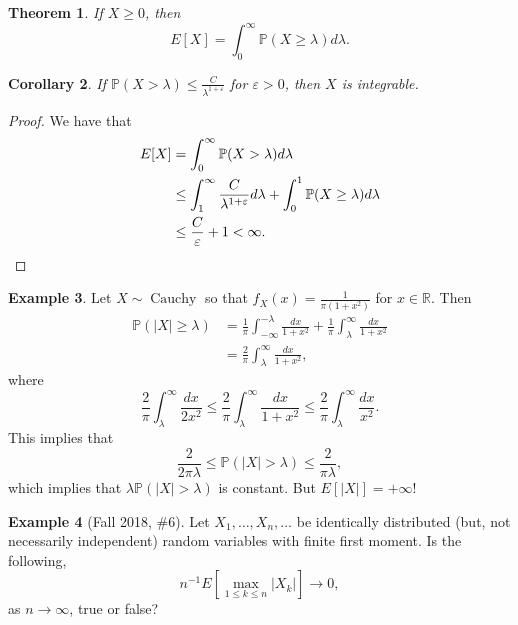 \documentclass[12pt,reqno]{article}
\theoremstyle{plain}
\newtheorem{theorem}{Theorem}[section]
\newtheorem{cor}[theorem]{Corollary}
\theoremstyle{definition}
\newtheorem{example}[theorem]{Example}
\begin{document}
\begin{theorem}
If $X \geq 0$, then 
\[
E[X] = \int_0^{\infty} \mathbb{P}(X \geq \lambda) d\lambda. 
\]
\end{theorem} 

\begin{cor} 
If $\mathbb{P}(X > \lambda) \leq \frac{C}{\lambda^{1+\varepsilon}}$ for 
$\varepsilon > 0$, then $X$ is integrable. 
\end{cor}
\begin{proof} 
We have that 
\begin{align*} 
E[X] & = \int_0^{\infty} \mathbb{P}(X > \lambda) d\lambda \\ 
     & \leq \int_1^{\infty} \frac{C}{\lambda^{1+\varepsilon}} d\lambda + 
     \int_0^1 \mathbb{P}(X \geq \lambda) d\lambda \\ 
     & \leq \frac{C}{\varepsilon} + 1 < \infty. 
     \qedhere 
\end{align*} 
\end{proof} 

\begin{example}
Let $X \sim \operatorname{Cauchy}$ so that 
$f_X(x) = \frac{1}{\pi(1+x^2)}$ for $x \in \mathbb{R}$. Then 
\begin{align*} 
\mathbb{P}(|X| \geq \lambda) & = 
     \frac{1}{\pi} \int_{-\infty}^{-\lambda} 
     \frac{dx}{1+x^2} + \frac{1}{\pi} \int_{\lambda}^{\infty} 
     \frac{dx}{1+x^2} \\ 
     & = \frac{2}{\pi} \int_{\lambda}^{\infty} \frac{dx}{1+x^2}, 
\end{align*} 
where 
\[
\frac{2}{\pi} \int_{\lambda}^{\infty} \frac{dx}{2x^2} \leq 
     \frac{2}{\pi} \int_{\lambda}^{\infty} \frac{dx}{1+x^2} \leq 
     \frac{2}{\pi} \int_{\lambda}^{\infty} \frac{dx}{x^2}. 
\]
This implies that 
\[
\frac{2}{2\pi\lambda} \leq \mathbb{P}(|X| > \lambda) \leq 
     \frac{2}{\pi\lambda}, 
\]
which implies that $\lambda \mathbb{P}(|X| > \lambda)$ is constant. 
But $E[|X|] = +\infty$! 
\end{example} 

\begin{example}[Fall 2018, \#6]
Let $X_1,\ldots,X_n,\ldots$ be identically distributed (but, not necessarily 
independent) random variables with finite first moment. Is the following, 
\[
n^{-1} E\left[\max_{1 \leq k \leq n} |X_k|\right] \longrightarrow 0, 
\]
as $n \rightarrow \infty$, true or false? 
\end{example} 
\end{document}
